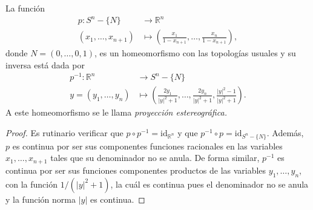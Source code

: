 
\begin{theorem}
La función
\begin{align*}
    p : S^n-\{ N \} & \longrightarrow \mathbb{R}^n \\
    (x_1,\ldots,x_{n+1}) & \longmapsto \left( \frac{x_1}{1-x_{n+1}}, \ldots, \frac{x_n}{1-x_{n+1}} \right),
\end{align*}
donde $N=(0,\ldots,0,1)$, es un homeomorfismo con las topologías usuales y su inversa está dada por
\begin{align*}
    p^{-1} : \mathbb{R}^n & \longrightarrow S^n - \{ N \} \\
    y = (y_1,\ldots,y_n) & \longmapsto \left( \frac{2 y_1}{|y|^2+1}, \ldots, \frac{2 y_n}{|y|^2+1}, \frac{|y|^2-1}{|y|^2+1} \right).
\end{align*}
A este homeomorfismo se le llama \itshape{proyección estereográfica}.
\end{theorem}

\begin{proof}
Es rutinario verificar que $p \circ p^{-1} = \text{id}_{\mathbb{R}^n}$ y que $p^{-1} \circ p = \text{id}_{S^n - \{ N \}}$. Además, $p$ es continua por ser sus componentes funciones racionales en las variables $x_1,\ldots,x_{n+1}$ tales que su denominador no se anula. De forma similar, $p^{-1}$ es continua por ser sus funciones componentes productos de las variables $y_1,\ldots,y_n$, con la función $1/(|y|^2+1)$, la cuál es continua pues el denominador no se anula y la función norma $|y|$ es continua.
\end{proof}
